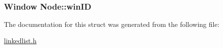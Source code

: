 \subsubsection[{win\+I\+D}]{\setlength{\rightskip}{0pt plus 5cm}Window Node\+::win\+I\+D}\label{structNode_a9b48ab73d4bb7a253057af4aaa165a1d}


The documentation for this struct was generated from the following file\+:\begin{DoxyCompactItemize}
\item 
\hyperlink{linkedlist_8h}{linkedlist.\+h}\end{DoxyCompactItemize}
